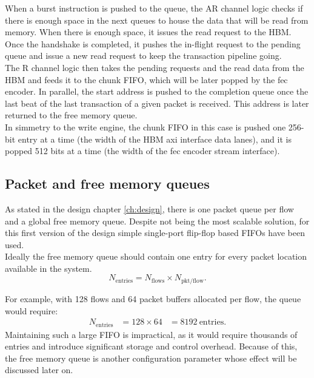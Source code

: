 When a burst instruction is pushed to the queue, the AR channel logic checks if there is enough space in the next 
queues to house the data that will be read from memory. When there is enough space, it issues the read request to the HBM. 
Once the handshake is completed, it pushes the in-flight request to the pending queue and issue a new read request to keep 
the transaction pipeline going. \\

The R channel logic then takes the pending requests and the read data from the HBM and feeds it to the chunk FIFO, which 
will be later popped by the \gls{fec} encoder. In parallel, the start address is pushed to the completion queue once the last beat 
of the last transaction of a given packet is received. This address is later returned to the free memory queue. \\

In simmetry to the write engine, the chunk FIFO in this case is pushed one 256-bit entry at a time (the width of the HBM \gls{axi} interface data lanes),
and it is popped 512 bits at a time (the width of the \gls{fec} encoder stream interface).

\subsection{Packet and free memory queues}

As stated in the design chapter \ref{ch:design}, there is one packet queue per flow and a global free memory queue. 
Despite not being the most scalable solution, for this first version of the design simple single-port flip-flop based FIFOs have been used. \\

Ideally the free memory queue should contain one entry for every packet location available in the system. 
\[
N_{\mathrm{entries}}
=
N_{\mathrm{flows}}
\times
N_{\mathrm{pkt/flow}}.
\]

For example, with 128 flows and 64 packet buffers allocated per flow, the queue would require:
\[
\begin{aligned}
N_{\mathrm{entries}}
&=
128 \times 64 
&=
\boxed{8192\ \mathrm{entries}}.
\end{aligned}
\]
Maintaining such a large FIFO is impractical, as it would require thousands
of entries and introduce significant storage and control overhead. Because of this, the free memory queue is 
another configuration parameter whose effect will be discussed later on. \\
